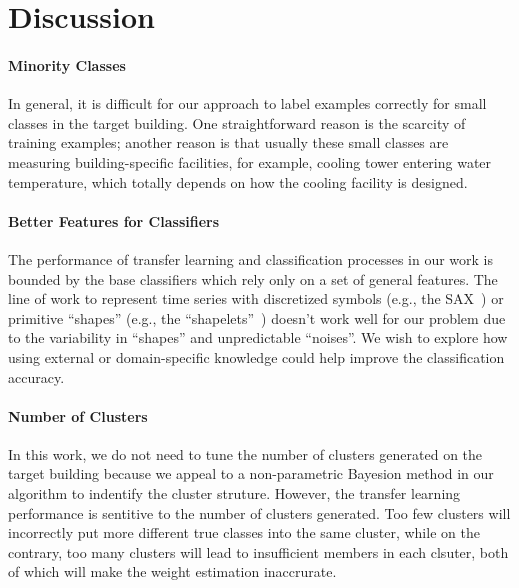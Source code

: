 \section{Discussion}
\paragraph{Minority Classes} In general, it is difficult for our approach to label examples correctly for small classes in the target building. One straightforward reason is the scarcity of training examples; another reason is that usually these small classes are measuring building-specific facilities, for example, cooling tower entering water temperature, which totally depends on how the cooling facility is designed.

\paragraph{Better Features for Classifiers} The performance of transfer learning and classification processes in our work is bounded by the base classifiers which rely only on a set of general features. The line of work to represent time series with discretized symbols (e.g., the SAX~\cite{sax}) or primitive ``shapes'' (e.g., the ``shapelets''~\cite{shapelet1, shapelet2}) doesn't work well for our problem due to the variability in ``shapes'' and unpredictable ``noises''. We wish to explore how using external or domain-specific knowledge could help improve the classification accuracy. 

\paragraph{Number of Clusters}
In this work, we do not need to tune the number of clusters generated on the target building because we appeal to a non-parametric Bayesion method in our algorithm to indentify the cluster struture. However, the transfer learning performance is sentitive to the number of clusters generated.
Too few clusters will incorrectly put more different true classes into the same cluster, while on the contrary, too many clusters will lead to insufficient members in each clsuter, both of which will make the weight estimation inaccrurate.
